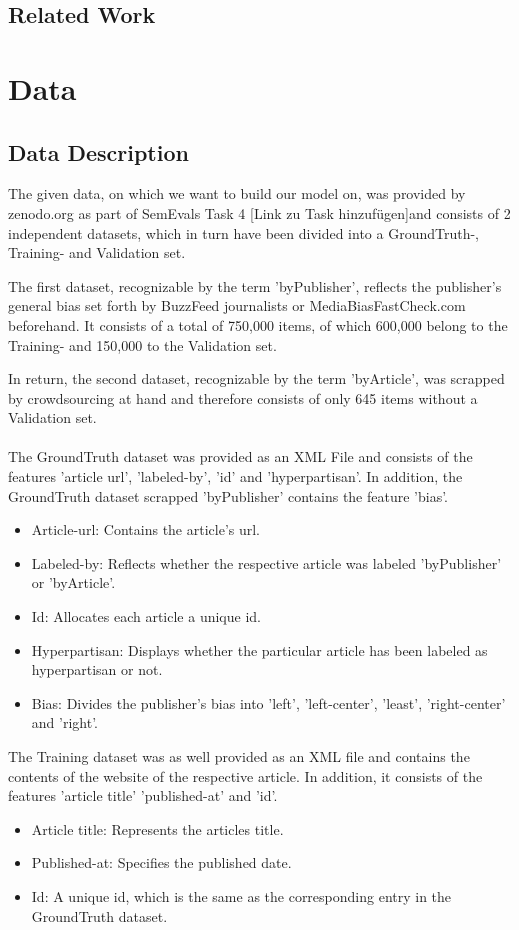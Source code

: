 \documentclass[11pt,titlepage,oneside,openany]{book}
\begin{document}
\section{Related Work}


\chapter{Data}
\label{cha:theory}


\section{Data Description}
 The given data, on which we want to build our model on, was provided by zenodo.org as part of SemEvals Task 4 [Link zu Task hinzufügen]and consists of 2 independent datasets, which in turn have been divided into a GroundTruth-, Training- and Validation set.
 
 \noindent The first dataset, recognizable by the term 'byPublisher', reflects the publisher's general bias set forth by BuzzFeed journalists or MediaBiasFastCheck.com beforehand. It consists of a total of 750,000 items, of which 600,000 belong to the Training- and 150,000 to the Validation set.
 
 \noindent In return, the second dataset, recognizable by the term 'byArticle', was scrapped by crowdsourcing at hand and therefore consists of only 645 items without a Validation set.\\
 \\
 The GroundTruth dataset was provided as an XML File and consists of the features 'article url', 'labeled-by', 'id' and 'hyperpartisan'. In addition, the GroundTruth dataset scrapped 'byPublisher' contains the feature 'bias'.
\begin{itemize}
	\item Article-url: Contains the article's url.
	\item Labeled-by: Reflects whether the respective article was labeled 'byPublisher' or 'byArticle'.
	\item Id: Allocates each article a unique id.
	\item Hyperpartisan: Displays whether the particular article has been labeled as hyperpartisan or not.
	\item Bias: Divides the publisher's bias into 'left', 'left-center', 'least', 'right-center' and 'right'.
\end{itemize}
 The Training dataset was as well provided as an XML file and contains the contents of the website of the respective article. In addition, it consists of the features 'article title' 'published-at' and 'id'.
\begin{itemize}
	\item Article title: Represents the articles title.
	\item Published-at: Specifies the published date.
	\item Id: A unique id, which is the same as the corresponding entry in the GroundTruth dataset.
\end{itemize}
\end{document}
